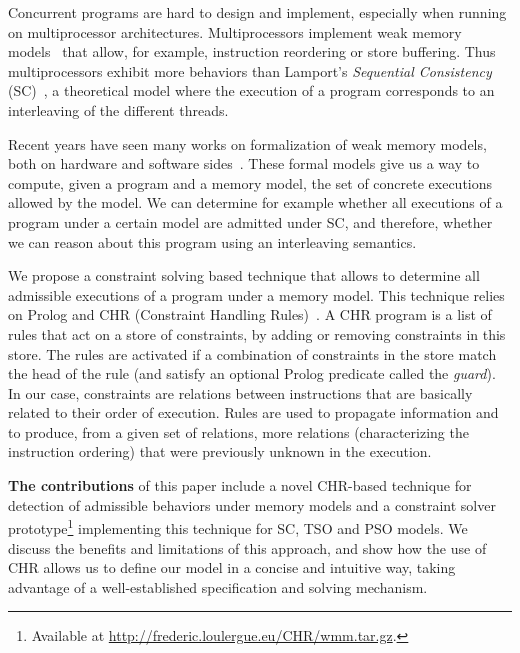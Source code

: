 

Concurrent programs are hard to design and implement, especially when
running on multiprocessor architectures. Multiprocessors implement
weak memory models~\cite{AG1996:IEEEC} that allow, for example,
instruction reordering or store buffering. Thus multiprocessors
exhibit more behaviors than Lamport’s \emph{Sequential Consistency}
(SC)~\cite{L79:IEEE}, a theoretical model where the execution of a
program corresponds to an interleaving of the different threads.

Recent years have seen many works on formalization of weak memory
models, both on hardware and software
sides~\cite{%
Yang:2005,AM2006:ISCA,SJM2007:PPOPP,BA2008:PLDI,Boudol:2009,AMT2014:TPLS,Abe:2014}.
These formal models give us a way to compute, given a program and a
memory model, the set of concrete executions allowed by the
model. We can determine for example whether all executions of a program 
under a certain model are admitted under SC, and therefore, whether we can
reason about this program using an interleaving semantics.

We propose a constraint solving based technique that allows to
determine all admissible executions of a program under a memory
model. This technique relies on Prolog and CHR (Constraint Handling
Rules)~\cite{Fruhwirth1998}.  A CHR program is a list of rules that act
on a store of constraints, by adding or removing constraints in this
store. The rules are activated if a combination of constraints in the
store match the head of the rule (and satisfy an optional Prolog predicate called the \emph{guard}).  In our
case, constraints are relations between instructions that are
basically related to their order of execution.  Rules are used to
propagate information and to produce, from a given set of relations,
more relations (characterizing the instruction ordering) that were
previously unknown in the execution.

{\bf The contributions} of this paper include a novel CHR-based technique
for detection of admissible behaviors under memory models and a
constraint solver prototype\footnote{Available at \url{http://frederic.loulergue.eu/CHR/wmm.tar.gz}.}
implementing this technique for SC, TSO and PSO
models.  We discuss the benefits and limitations of this approach, and
show how the use of CHR allows us to define our model in a concise and
intuitive way, taking advantage of a well-established specification
and solving mechanism.

